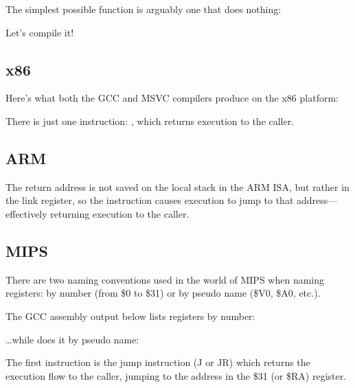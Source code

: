 \label{empty_func}

The simplest possible function is arguably one that does nothing:



Let's compile it!

\subsection{x86}

Here's what both the GCC and MSVC compilers produce on the x86 platform:



There is just one instruction: \RET, which returns execution to the \gls{caller}.

\subsection{ARM}



The return address is not saved on the local stack in the ARM \ac{ISA}, but rather in the link register, 
so the  instruction causes execution to jump to that address---effectively returning execution
to the \gls{caller}.

\subsection{MIPS}

There are two naming conventions used in the world of MIPS when naming registers:
by number (from \$0 to \$31) or by pseudo name (\$V0, \$A0, etc.).

The GCC assembly output below lists registers by number:



\dots while \IDA does it by pseudo name:



The first instruction is the jump instruction (J or JR) which returns the execution flow to the \gls{caller},
jumping to the address in the \$31 (or \$RA) register.

